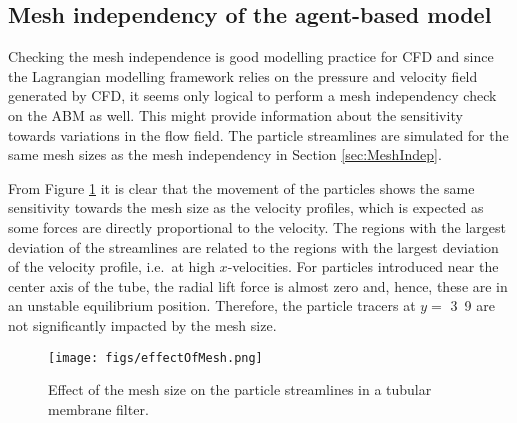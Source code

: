 \subsection{Mesh independency of the agent-based model} %
Checking the mesh independence is good modelling practice for \gls{CFD} and since the Lagrangian modelling framework relies on the pressure and velocity field generated by \gls{CFD}, it seems only logical to perform a mesh independency check on the \gls{ABM} as well. This might provide information about the sensitivity towards variations in the flow field. The particle streamlines are simulated for the same mesh sizes as the mesh independency in Section \ref{sec:MeshIndep}.\par  %
From Figure \ref{fig:effectOfMesh} it is clear that the movement of the particles shows the same sensitivity towards the mesh size as the velocity profiles, which is expected as some forces are directly proportional to the velocity. The regions with the largest deviation of the streamlines are related to the regions with the largest deviation of the velocity profile, i.e.\ at high $x$-velocities. For particles introduced near the center axis of the tube, the radial lift force is almost zero and, hence, these are in an unstable equilibrium position. Therefore, the particle tracers at $y =$ \unit{3.9}{\milli\metre} are not significantly impacted by the mesh size. 

\begin{figure}[H]
 \centering
 \texttt{[image: figs/effectOfMesh.png]}
 \caption{Effect of the mesh size on the particle streamlines in a tubular membrane filter. \label{fig:effectOfMesh}}
\end{figure}

